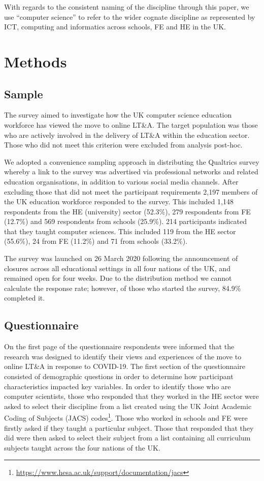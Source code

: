 \documentclass[sigconf]{acmart}
\begin{document}
With regards to the consistent naming of the discipline through this
paper, we use ``computer science'' to refer to the wider cognate
discipline as represented by ICT, computing and informatics across
schools, FE and HE in the UK.

\section{Methods}\label{methods}

\subsection{Sample}

The survey aimed to investigate how the UK computer science education
workforce has viewed the move to online LT\&A. The target population was
those who are actively involved in the delivery of LT\&A within the
education sector. Those who did not meet this criterion were excluded
from analysis post-hoc.

We adopted a convenience sampling approach in distributing the
Qualtrics survey whereby a link to the survey was advertised via
professional networks and related education organisations, in addition
to various social media channels. After excluding those that did not
meet the participant requirements 2,197 members of the UK education
workforce responded to the survey. This included 1,148 respondents
from the HE (university) sector (52.3\%), 279 respondents from FE
(12.7\%) and 569 respondents from schools (25.9\%). 214 participants
indicated that they taught computer sciences. This included 119 from
the HE sector (55.6\%), 24 from FE (11.2\%) and 71 from schools
(33.2\%).

The survey was launched on 26 March 2020 following the announcement of
closures across all educational settings in all four nations of the
UK, and remained open for four weeks. Due to the distribution method
we cannot calculate the response rate; however, of those who started
the survey, 84.9\% completed it.

\subsection{Questionnaire}

On the first page of the questionnaire respondents were informed that
the research was designed to identify their views and experiences of
the move to online LT\&A in response to COVID-19. The first section of
the questionnaire consisted of demographic questions in order to
determine how participant characteristics impacted key variables. In
order to identify those who are computer scientists, those who
responded that they worked in the HE sector were asked to select their
discipline from a list created using the UK Joint Academic Coding of
Subjects (JACS)
codes\footnote{\url{https://www.hesa.ac.uk/support/documentation/jacs}}. Those
who worked in schools and FE were firstly asked if they taught a
particular subject. Those that responded that they did were then asked
to select their subject from a list containing all curriculum subjects
taught across the four nations of the UK.
\end{document}
